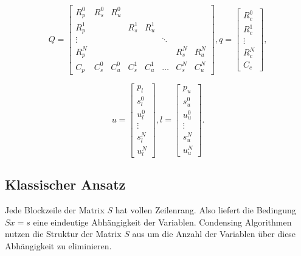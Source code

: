$$Q=\left[ \begin{array}{cccccccc}
R_p^0 & R_s^0 & R_u^0 &  &  &  &  &  \\ 
R_p^1 &  &  & R_s^1 & R_u^1 &  &  &  \\ 
\vdots &  &  &  &  & \ddots &  &  \\ 
R_p^{N} &  &  &  &  &  & R_s^{N} & R_u^{N} \\ 
C_p & C_s^0 & C_u^0 & C_s^1 & C_u^1 & \hdots & C_s^{N} & C_u^{N}
\end{array}  \right],
q= \left[ \begin{array}{c}
R_c^0 \\ 
R_c^1 \\ 
\vdots \\ 
R_c^{N} \\ 
C_c
\end{array}  \right],$$

$$u= \left[ \begin{array}{c}
p_l \\ 
s^0_l \\ 
u^0_l \\ 
\vdots \\ 
s^{N}_l \\ 
u^{N}_l
\end{array} \right],
l= \left[ \begin{array}{c}
p_u \\ 
s^0_u \\ 
u^0_u \\ 
\vdots \\ 
s^{N}_u \\ 
u^{N}_u
\end{array} \right].$$

\subsection{Klassischer Ansatz}



Jede Blockzeile der Matrix $S$ hat vollen Zeilenrang.  Also liefert die Bedingung $Sx=s$ eine eindeutige Abhängigkeit der Variablen. Condensing Algorithmen nutzen die Struktur der Matrix $S$ aus um die Anzahl der Variablen über diese Abhängigkeit zu eliminieren. 

